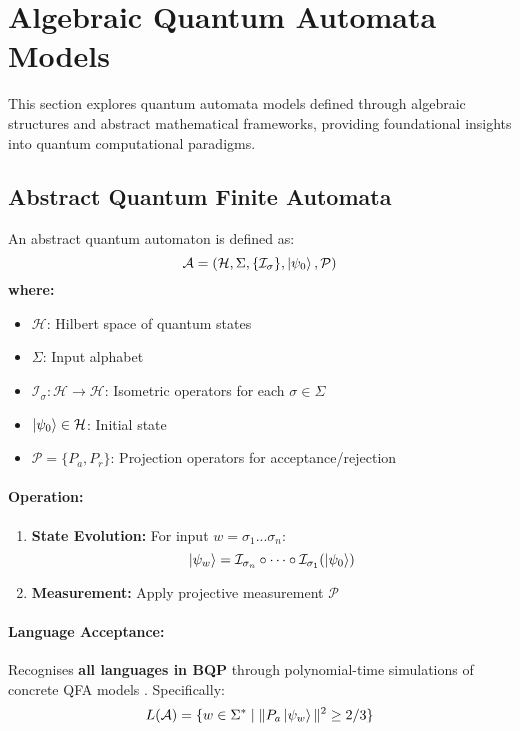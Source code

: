 \section{Algebraic Quantum Automata Models}
\label{sec:abstract-qfa}

This section explores quantum automata models defined through algebraic structures and abstract mathematical frameworks, providing foundational insights into quantum computational paradigms.

\subsection{Abstract Quantum Finite Automata}
\label{subsec:abstract-qfa}

\begin{definition}
An abstract quantum automaton is defined as:
\[
\mathcal{A} = (\mathcal{H}, \Sigma, \{\mathcal{I}_\sigma\}, \ket{\psi_0}, \mathcal{P})
\]
\textbf{where:}
\begin{itemize}
    \item $\mathcal{H}$: Hilbert space of quantum states
    \item $\Sigma$: Input alphabet
    \item $\mathcal{I}_\sigma: \mathcal{H} \rightarrow \mathcal{H}$: Isometric operators for each $\sigma \in \Sigma$
    \item $\ket{\psi_0} \in \mathcal{H}$: Initial state
    \item $\mathcal{P} = \{P_a, P_r\}$: Projection operators for acceptance/rejection
\end{itemize}
\end{definition}

\paragraph{Operation:}
\begin{enumerate}
    \item \textbf{State Evolution:} For input $w = \sigma_1...\sigma_n$:
    \[
    \ket{\psi_w} = \mathcal{I}_{\sigma_n} \circ \cdots \circ \mathcal{I}_{\sigma_1} (\ket{\psi_0})
    \]
    \item \textbf{Measurement:} Apply projective measurement $\mathcal{P}$
\end{enumerate}

\paragraph{Language Acceptance:}
Recognises \textbf{all languages in BQP} through polynomial-time simulations of concrete QFA models \cite{manin1980computable, gruska2005}. Specifically:
\[
L(\mathcal{A}) = \{w \in \Sigma^* \mid \|P_a\ket{\psi_w}\|^2 \geq 2/3\}
\]

